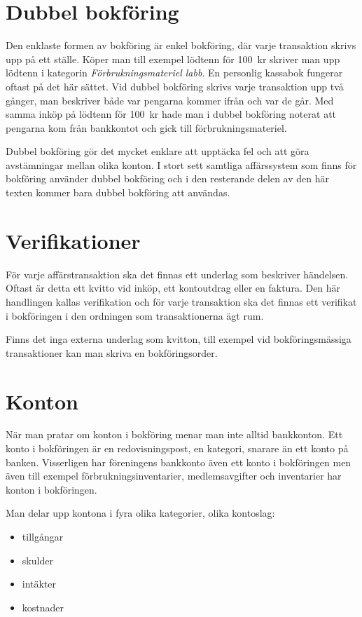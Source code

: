 \section{Dubbel bokföring}
Den enklaste formen av bokföring är enkel bokföring, där varje transaktion skrivs upp på ett ställe. Köper man till exempel lödtenn för 100~kr skriver man upp lödtenn i kategorin \emph{Förbrukningsmateriel labb}. En personlig kassabok fungerar oftast på det här sättet.
Vid dubbel bokföring skrivs varje transaktion upp två gånger, man beskriver både var pengarna kommer ifrån och var de går. Med samma inköp på lödtenn för 100~kr hade man i dubbel bokföring noterat att pengarna kom från bankkontot och gick till förbrukningsmateriel.

Dubbel bokföring gör det mycket enklare att upptäcka fel och att göra avstämningar mellan olika konton. I stort sett samtliga affärssystem som finns för bokföring använder dubbel bokföring och i den resterande delen av den här texten kommer bara dubbel bokföring att användas.

\section{Verifikationer}
För varje affärstransaktion ska det finnas ett underlag som beskriver händelsen. Oftast är detta ett kvitto vid inköp, ett kontoutdrag eller en faktura. Den här handlingen kallas verifikation och för varje transaktion ska det finnas ett verifikat i bokföringen i den ordningen som transaktionerna ägt rum.

Finns det inga externa underlag som kvitton, till exempel vid bokföringsmässiga transaktioner kan man skriva en bokföringsorder.

\section{Konton}
När man pratar om konton i bokföring menar man inte alltid bankkonton. Ett konto i bokföringen är en redovisningspost, en kategori, snarare än ett konto på banken. Visserligen har föreningens bankkonto även ett konto i bokföringen men även till exempel förbrukningsinventarier, medlemsavgifter och inventarier har konton i bokföringen.

Man delar upp kontona i fyra olika kategorier, olika kontoslag:
\begin{itemize}\itemsep2pt
	\item tillgångar
	\item skulder
	\item intäkter
	\item kostnader
\end{itemize}

